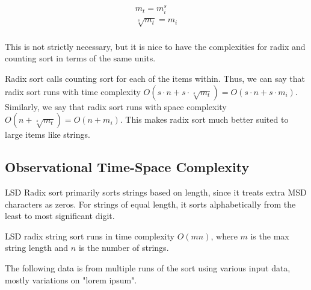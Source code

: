 \documentclass[12pt]{amsart}
\begin{document}
    \[
    \begin{aligned}
        m_t = m_i^s            \\
        \sqrt[s]{m_t} = m_i    \\
    \end{aligned}
    \]

    This is not strictly necessary, but it is nice to have the
    complexities for radix and counting sort in terms of the
    same units.

    Radix sort calls counting sort for each of the items
    within. Thus, we can say that radix sort runs with time complexity
    $O(s \cdot n + s \cdot \sqrt[s]{m_t}) = O(s \cdot n + s \cdot m_i)$.
    Similarly, we say that radix sort runs with space complexity
    $O(n + \sqrt[s]{m_t}) = O(n + m_i)$. This makes radix sort
    much better suited to large items like strings.

    \subsection{Observational Time-Space Complexity}

    LSD Radix sort primarily sorts strings based on length,
    since it treats extra MSD characters as zeros. For strings
    of equal length, it sorts alphabetically from the least to
    most significant digit.

    LSD radix string sort runs in time complexity $O(mn)$, where
    $m$ is the max string length and $n$ is the number of
    strings.

    The following data is from multiple runs of the sort using
    various input data, mostly variations on "lorem ipsum".

    \newpage
\end{document}
